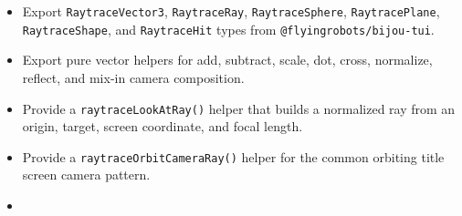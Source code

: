 \begin{itemize}
\tightlist
\item
  Export \texttt{R\allowbreak{}a\allowbreak{}y\allowbreak{}t\allowbreak{}r\allowbreak{}a\allowbreak{}c\allowbreak{}e\allowbreak{}V\allowbreak{}e\allowbreak{}c\allowbreak{}t\allowbreak{}o\allowbreak{}r\allowbreak{}3}, \texttt{R\allowbreak{}a\allowbreak{}y\allowbreak{}t\allowbreak{}r\allowbreak{}a\allowbreak{}c\allowbreak{}e\allowbreak{}R\allowbreak{}a\allowbreak{}y}, \texttt{R\allowbreak{}a\allowbreak{}y\allowbreak{}t\allowbreak{}r\allowbreak{}a\allowbreak{}c\allowbreak{}e\allowbreak{}S\allowbreak{}p\allowbreak{}h\allowbreak{}e\allowbreak{}r\allowbreak{}e}, \texttt{R\allowbreak{}a\allowbreak{}y\allowbreak{}t\allowbreak{}r\allowbreak{}a\allowbreak{}c\allowbreak{}e\allowbreak{}P\allowbreak{}l\allowbreak{}a\allowbreak{}n\allowbreak{}e}, \texttt{R\allowbreak{}a\allowbreak{}y\allowbreak{}t\allowbreak{}r\allowbreak{}a\allowbreak{}c\allowbreak{}e\allowbreak{}S\allowbreak{}h\allowbreak{}a\allowbreak{}p\allowbreak{}e}, and \texttt{R\allowbreak{}a\allowbreak{}y\allowbreak{}t\allowbreak{}r\allowbreak{}a\allowbreak{}c\allowbreak{}e\allowbreak{}H\allowbreak{}i\allowbreak{}t} types from \texttt{@\allowbreak{}f\allowbreak{}l\allowbreak{}y\allowbreak{}i\allowbreak{}n\allowbreak{}g\allowbreak{}r\allowbreak{}o\allowbreak{}b\allowbreak{}o\allowbreak{}t\allowbreak{}s\allowbreak{}/\allowbreak{}b\allowbreak{}i\allowbreak{}j\allowbreak{}o\allowbreak{}u\allowbreak{}-\allowbreak{}t\allowbreak{}u\allowbreak{}i}.
\item
  Export pure vector helpers for add, subtract, scale, dot, cross, normalize, reflect, and mix-in camera composition.
\item
  Provide a \texttt{r\allowbreak{}a\allowbreak{}y\allowbreak{}t\allowbreak{}r\allowbreak{}a\allowbreak{}c\allowbreak{}e\allowbreak{}L\allowbreak{}o\allowbreak{}o\allowbreak{}k\allowbreak{}A\allowbreak{}t\allowbreak{}R\allowbreak{}a\allowbreak{}y\allowbreak{}(\allowbreak{})} helper that builds a normalized ray from an origin, target, screen coordinate, and focal length.
\item
  Provide a \texttt{r\allowbreak{}a\allowbreak{}y\allowbreak{}t\allowbreak{}r\allowbreak{}a\allowbreak{}c\allowbreak{}e\allowbreak{}O\allowbreak{}r\allowbreak{}b\allowbreak{}i\allowbreak{}t\allowbreak{}C\allowbreak{}a\allowbreak{}m\allowbreak{}e\allowbreak{}r\allowbreak{}a\allowbreak{}R\allowbreak{}a\allowbreak{}y\allowbreak{}(\allowbreak{})} helper for the common orbiting title screen camera pattern.
\item

\end{itemize}

